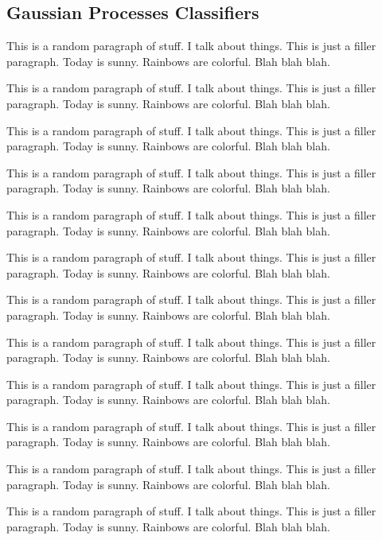 \documentclass{article}
\begin{document}
	\subsection{Gaussian Processes Classifiers}
	
		{\color{BurntOrange} This is a random paragraph of stuff. I talk about things. This is just a filler paragraph. Today is sunny. Rainbows are colorful. Blah blah blah.}
		
		{\color{BurntOrange} This is a random paragraph of stuff. I talk about things. This is just a filler paragraph. Today is sunny. Rainbows are colorful. Blah blah blah.}
		
		{\color{BurntOrange} This is a random paragraph of stuff. I talk about things. This is just a filler paragraph. Today is sunny. Rainbows are colorful. Blah blah blah.}
		
		{\color{BurntOrange} This is a random paragraph of stuff. I talk about things. This is just a filler paragraph. Today is sunny. Rainbows are colorful. Blah blah blah.}
		
		{\color{BurntOrange} This is a random paragraph of stuff. I talk about things. This is just a filler paragraph. Today is sunny. Rainbows are colorful. Blah blah blah.}
		
		{\color{BurntOrange} This is a random paragraph of stuff. I talk about things. This is just a filler paragraph. Today is sunny. Rainbows are colorful. Blah blah blah.}
		
		{\color{BurntOrange} This is a random paragraph of stuff. I talk about things. This is just a filler paragraph. Today is sunny. Rainbows are colorful. Blah blah blah.}
		
		{\color{BurntOrange} This is a random paragraph of stuff. I talk about things. This is just a filler paragraph. Today is sunny. Rainbows are colorful. Blah blah blah.}
		
		{\color{BurntOrange} This is a random paragraph of stuff. I talk about things. This is just a filler paragraph. Today is sunny. Rainbows are colorful. Blah blah blah.}
		
		{\color{BurntOrange} This is a random paragraph of stuff. I talk about things. This is just a filler paragraph. Today is sunny. Rainbows are colorful. Blah blah blah.}
		
		{\color{BurntOrange} This is a random paragraph of stuff. I talk about things. This is just a filler paragraph. Today is sunny. Rainbows are colorful. Blah blah blah.}
		
		{\color{BurntOrange} This is a random paragraph of stuff. I talk about things. This is just a filler paragraph. Today is sunny. Rainbows are colorful. Blah blah blah.}
		
\end{document}
